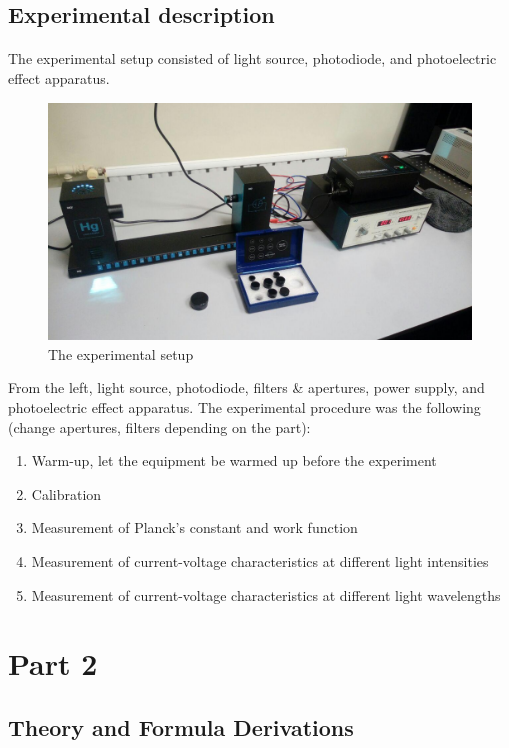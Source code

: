 \documentclass{article}
\begin{document}
\subsection{Experimental description}
\paragraph{}The experimental setup consisted of light source, photodiode, and photoelectric effect apparatus.

\begin{figure}[H]
\centering
  \includegraphics[width=.8\linewidth]{Photoelectric.jpg}
    \caption{The experimental setup}
\end{figure}


From the left, light source, photodiode, filters \& apertures, power supply, and photoelectric effect apparatus. The experimental procedure was the following (change apertures, filters depending on the part):

\begin{enumerate}
    \item Warm-up, let the equipment be warmed up before the experiment
\item Calibration
\item Measurement of Planck's constant and work function
\item Measurement of current-voltage characteristics at different light intensities
\item Measurement of current-voltage characteristics at different light wavelengths
\end{enumerate}

\newpage


\section{Part 2}
\subsection{Theory and Formula Derivations}
\end{document}
